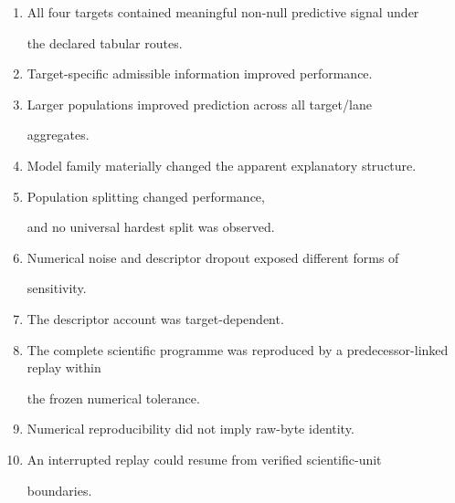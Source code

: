 \documentclass[11pt,a4paper,oneside]{report}
\begin{document}
\begin{enumerate}



\item

All four targets contained meaningful non-null predictive signal under

the declared tabular routes.



\item

Target-specific admissible information improved performance.



\item

Larger populations improved prediction across all target/lane

aggregates.



\item

Model family materially changed the apparent explanatory structure.



\item

Population splitting changed performance,

and no universal hardest split was observed.



\item

Numerical noise and descriptor dropout exposed different forms of

sensitivity.



\item

The descriptor account was target-dependent.



\item

The complete scientific programme was reproduced by a predecessor-linked replay within

the frozen numerical tolerance.



\item

Numerical reproducibility did not imply raw-byte identity.



\item

An interrupted replay could resume from verified scientific-unit

boundaries.



\end{enumerate}
\end{document}
